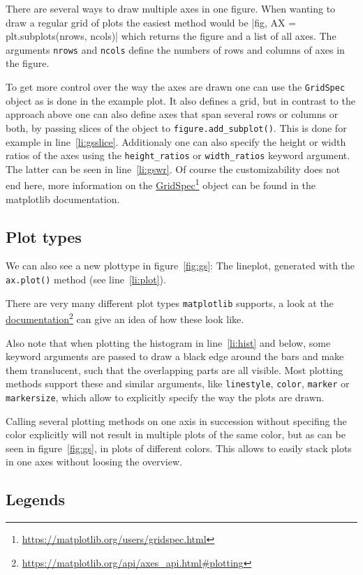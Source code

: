 \documentclass[a4paper, 11pt, onecolumn]{article}
\newcommand{\mpl}{\texttt{matplotlib}\xspace}
\newcommand{\pl}[1]{\mbox{\texttt{#1}\xspace}}
\newcommand{\fref}[2]{\href{#1}{#2}\footnote{\url{#1}}}
\newcommand{\baseref}[3]{\mbox{#1 \ref{#2:#3}\xspace}}
\newcommand{\fig}[1]{\baseref{figure}{fig}{#1}}
\newcommand{\lin}[1]{\baseref{line}{li}{#1}}
\begin{document}
There are several ways to draw multiple axes in one figure. When wanting to
draw a regular grid of plots the easiest method would be
|fig, AX = plt.subplots(nrows, ncols)|
which returns the figure and a list of all axes. The arguments \pl{nrows} and 
\pl{ncols} define the numbers of rows and columns of axes in the figure.

To get more control over the way the axes are drawn one can use the
\pl{GridSpec} object as is done in the example plot. It also defines a grid,
but in contrast to the approach above one can also define axes that span
several rows or columns or both, by passing slices of the object to
\pl{figure.add\_subplot()}. This is done for example in \lin{gsslice}.
Additionaly one can also specify the height or width ratios of the axes using
the \pl{height\_ratios} or \pl{width\_ratios} keyword argument. The latter can
be seen in \lin{gswr}. Of course the customizability does not end here,
more information on the
\fref{https://matplotlib.org/users/gridspec.html}{GridSpec} object can be found
in the matplotlib documentation.


\subsection{Plot types}

We can also see a new plottype in \fig{gs}: The lineplot, generated
with the \pl{ax.plot()} method (see \lin{plot}).

There are very many different plot types \mpl supports, a look at the
\fref{https://matplotlib.org/api/axes\_api.html\#plotting}{documentation} can
give an idea of how these look like.

Also note that when plotting the histogram in \lin{hist} and below, some
keyword arguments are passed to draw a black edge around the bars and make them
translucent, such that the overlapping parts are all visible. Most plotting
methods support these and similar arguments, like \pl{linestyle}, \pl{color},
\pl{marker} or \pl{markersize}, which allow to explicitly specify the way the
plots are drawn.

Calling several plotting methods on one axis in succession without specifing the color explicitly will not result in multiple plots of the same color, but as
can be seen in \fig{gs}, in plots of different colors. This allows
to easily stack plots in one axes without loosing the overview.

\subsection{Legends}
\end{document}
